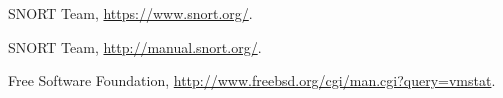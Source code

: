 \documentclass[10pt,a4paper]{article}
\begin{document}
    \begin{thebibliography}{9}

      SNORT Team,
      \url{https://www.snort.org/}.

      SNORT Team,
      \url{http://manual.snort.org/}.

      Free Software Foundation,
      \url{http://www.freebsd.org/cgi/man.cgi?query=vmstat}.
    \end{thebibliography}
\end{document}
